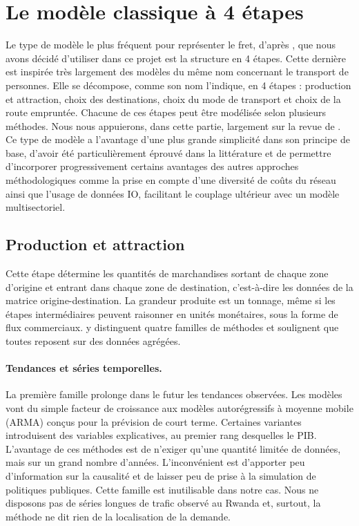 \documentclass[12pt,a4paper,french]{report}
\begin{document}
	\section{Le modèle classique à 4 étapes}
	\label{sec:4_etapes}
	
	Le type de modèle le plus fréquent pour représenter le fret, d'après \cite{deJong2004}, que nous avons décidé d'utiliser dans ce projet est la structure en 4 étapes.  Cette dernière est inspirée très largement des modèles du même nom concernant le transport de personnes. Elle se décompose, comme son nom l'indique, en 4 étapes : production et attraction, choix des destinations, choix du mode de transport et choix de la route empruntée. Chacune de ces étapes peut être modélisée selon plusieurs méthodes. Nous nous appuierons, dans cette partie, largement sur la revue de \cite{deJong2004}. Ce type de modèle a l'avantage d'une plus grande simplicité dans son principe de base, d'avoir été particulièrement éprouvé dans la littérature et de permettre d'incorporer progressivement certains avantages des autres approches méthodologiques comme la prise en compte d'une diversité de coûts du réseau ainsi que l'usage de données IO, facilitant le couplage ultérieur avec un modèle multisectoriel. 
	
	\subsection{Production et attraction}
	\label{subsec:prod_attraction}

	Cette étape détermine les quantités de marchandises sortant de chaque zone d'origine et entrant dans chaque zone de destination, c'est-à-dire les données de la matrice origine-destination. La grandeur produite est un tonnage, même si les étapes intermédiaires peuvent raisonner en unités monétaires, sous la forme de flux commerciaux. \cite{deJong2004} y distinguent quatre familles de méthodes et soulignent que toutes reposent sur des données agrégées. 

	\paragraph{Tendances et séries temporelles.} La première famille prolonge dans le futur les tendances observées. Les modèles vont du simple facteur de croissance aux modèles autorégressifs à moyenne mobile (ARMA) conçus pour la prévision de court terme. Certaines variantes introduisent des variables explicatives, au premier rang desquelles le PIB. L'avantage de ces méthodes est de n'exiger qu'une quantité limitée de données, mais sur un grand nombre d'années. L'inconvénient est d'apporter peu d'information sur la causalité et de laisser peu de prise à la simulation de politiques publiques. Cette famille est inutilisable dans notre cas. Nous ne disposons pas de séries longues de trafic observé au Rwanda et, surtout, la méthode ne dit rien de la localisation de la demande.
\end{document}
